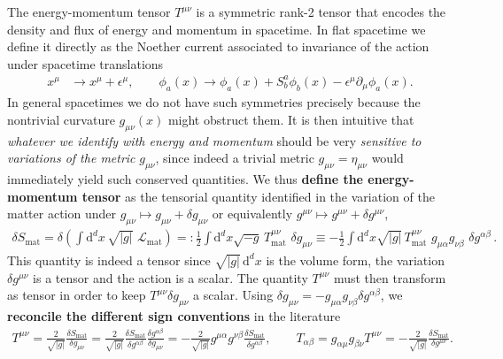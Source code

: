 \begin{mytheorem}
The energy-momentum tensor $T^{\mu\nu}$ is a symmetric rank-2 tensor that encodes the density and flux of energy and momentum in spacetime.
In flat spacetime we define it directly as the Noether current associated to invariance of the action under spacetime translations 
\begin{align}
    x^\mu &\to x^\mu + \epsilon^\mu,\qquad \phi_a(x) \to \phi_a(x) + S^a_b \phi_b(x)- \epsilon^\mu \partial_\mu \phi_a(x).
\end{align}
%
In general spacetimes we do not have such symmetries precisely because the nontrivial curvature $g_{\mu\nu}(x)$ might obstruct them.
It is then intuitive that \emph{whatever we identify with energy and momentum} should be very \emph{sensitive to variations of the metric} $g_{\mu\nu}$, since indeed a trivial metric $g_{\mu\nu}=\eta_{\mu\nu}$ would immediately yield such conserved quantities.
We thus \textbf{define the energy-momentum tensor} as the tensorial quantity identified in the variation of the matter action under $g_{\mu\nu}\mapsto g_{\mu\nu} + \delta g_{\mu\nu}$ or equivalently $g^{\mu\nu} \mapsto g^{\mu\nu} + \delta g^{\mu\nu}$,
\begin{align}
    \delta S_\text{mat} = \delta \left(\int \mathrm{d}^dx\,\sqrt{|g|}\,\,\mathcal{L}_\text{mat}\right)
    =: \frac{1}{2} \int \mathrm{d}^d x \sqrt{-g}\, T^{\mu\nu}_\text{mat}\,\,\delta g_{\mu\nu}
    \equiv - \frac{1}{2} \int \mathrm{d}^d x \sqrt{|g|}\, T^{\mu\nu}_\text{mat} \,\,g_{\mu\alpha} g_{\nu\beta} \,\,\delta g^{\alpha\beta}\,.
\end{align}
This quantity is indeed a tensor since $\sqrt{|g|}\,\mathrm{d}^d x $ is the volume form, the variation $\delta g^{\mu\nu}$ is a tensor and the action is a scalar.
The quantity $T^{\mu\nu}$ must then transform as tensor in order to keep $T^{\mu\nu} \delta g_{\mu\nu}$ a scalar.
%
Using $\delta g_{\mu\nu} = - g_{\mu\alpha} g_{\nu\beta} \delta g^{\alpha\beta}$, we \textbf{reconcile the different sign conventions} in the literature
{\small
\begin{align}
    T^{\mu\nu} = \frac{2}{\sqrt{|g|}} \frac{\delta S_\text{mat}}{\delta g_{\mu\nu}}
    = \frac{2}{\sqrt{|g|}} \frac{\delta S_\text{mat}}{\delta g^{\alpha\beta}} \frac{\delta g^{\alpha\beta}}{\delta g_{\mu\nu}}
    = - \frac{2}{\sqrt{|g|}} g^{\mu\alpha} g^{\nu\beta} \frac{\delta S_\text{mat}}{\delta g^{\alpha\beta}}
    ,\qquad
    T_{\alpha\beta} = g_{\alpha\mu} g_{\beta\nu} T^{\mu\nu}
    = -\frac{2}{\sqrt{|g|}} \frac{\delta S_\text{mat}}{\delta g^{\mu\nu}}.
\end{align}
}


\end{mytheorem}
